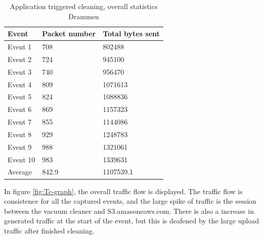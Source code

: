 \begin{table}[H]
\centering
\caption{Application triggered cleaning, overall statistics Drammen}
\label{tab:TCoverallDRA}
\begin{tabular}{|l|l|l|}
\hline
\textbf{Event} & \textbf{Packet number} & \textbf{Total bytes sent} \\ \hline
Event 1        & 708                    & 802488                    \\ \hline
Event 2        & 724                    & 945100                    \\ \hline
Event 3        & 740                    & 956470                    \\ \hline
Event 4        & 809                    & 1071613                   \\ \hline
Event 5        & 824                    & 1088836                   \\ \hline
Event 6        & 869                    & 1157323                   \\ \hline
Event 7        & 855                    & 1144086                   \\ \hline
Event 8        & 929                    & 1248783                   \\ \hline
Event 9        & 988                    & 1321061                   \\ \hline
Event 10       & 983                    & 1339631                   \\ \hline
Average        & 842.9                  & 1107539.1                 \\ \hline
\end{tabular}
\end{table}

In figure \ref{fig:Tc-graph}, the overall traffic flow is displayed. The traffic flow is consistence for all the captured events, and the large spike of traffic is the session between the vacuum cleaner and S3.amasoneaws.com. There is also a increase in generated traffic at the start of the event, but this is 
deafened by the large upload traffic after finished cleaning.

